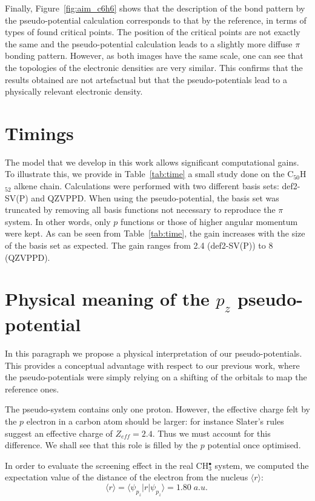 \documentclass[12pt]{article}
\begin{document}
Finally, Figure~\ref{fig:aim_c6h6} shows that the description of the bond pattern by the pseudo-potential
calculation corresponds to that by the reference, in terms of types of found critical points.
The position of the critical points are not exactly the same and the pseudo-potential calculation
leads to a slightly more diffuse $\pi$ bonding pattern.
However, as both images have the same scale, one can see that the topologies
of the electronic densities are very similar.
This confirms that the results obtained are not artefactual but that the pseudo-potentials
lead to a physically relevant electronic density.

\section*{\sffamily \large Timings}
The model that we develop in this work allows significant computational gains.
To illustrate this, we provide in Table~\ref{tab:time} a small study done on the C$_{50}$H$_{52}$
alkene chain.
Calculations were performed with two different basis sets: def2-SV(P) and QZVPPD.
When using the pseudo-potential, the basis set was truncated by removing all
basis functions not necessary to reproduce the
$\pi$ system.
In other words, only $p$ functions or those of higher angular momentum were kept.
As can be seen from Table~\ref{tab:time}, the gain increases
with the size of the basis set as expected.
The gain ranges from 2.4 (def2-SV(P)) to 8 (QZVPPD).

\section*{\sffamily \large Physical meaning of the \(p_{z}\) pseudo-potential} \label{minimalpotguess}

In this paragraph we propose a physical interpretation of our pseudo-potentials. This
provides a conceptual advantage with respect to our previous work,\cite{drujon_pseudopotentials_2013} 
where the pseudo-potentials were simply relying on a shifting of the orbitals to map the reference ones.

The pseudo-system contains only one proton. However, the effective charge felt by the $p$ electron in a carbon atom should be larger: for instance Slater's rules suggest an effective charge of $Z_{eff}=2.4$. Thus we must account for this difference. We shall see that this role is filled by the $p$ potential once optimised. 

In order to evaluate the screening effect in the real CH\(^{\bullet}_{3}\) system, we computed the expectation value of the distance of the electron from the nucleus \( \langle r \rangle \):
\begin{equation}
\langle r \rangle = \langle \psi_{p_{z}} | r | \psi_{p_{z}} \rangle = 1.80\;a.u.\
\label{equation:exp_r}
\end{equation}
\end{document}
